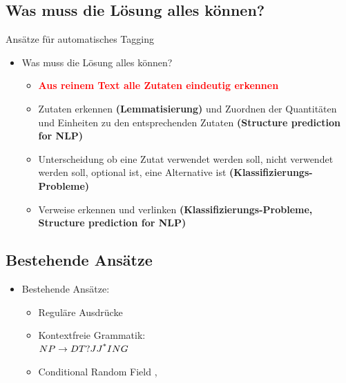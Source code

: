 \documentclass[12pt]{beamer}
\begin{document}
\subsection{Was muss die Lösung alles können?}
\begin{frame}{Ansätze für automatisches Tagging}
	\begin{itemize}
		\item Was muss die Lösung alles können?
		\begin{itemize}
			\item \textbf{\textcolor{red}{Aus reinem Text alle Zutaten eindeutig erkennen}}
			\item Zutaten erkennen \textbf{(Lemmatisierung)} und Zuordnen der Quantitäten und Einheiten zu den entsprechenden Zutaten \textbf{(Structure prediction for NLP)}
			\item Unterscheidung ob eine Zutat verwendet werden soll, nicht verwendet werden soll, optional ist, eine Alternative ist \textbf{(Klassifizierungs-Probleme)}
			\item Verweise erkennen und verlinken \textbf{(Klassifizierungs-Probleme, Structure prediction for NLP)}
		\end{itemize}
	\end{itemize}
\end{frame}

\subsection{Bestehende Ansätze}
\begin{frame}
	\begin{itemize}
		\item Bestehende Ansätze:
		\begin{itemize}
			\item Reguläre Ausdrücke \parencite{REgutGenug}
			\item Kontextfreie Grammatik: \parencite{GrammaBased} \\
			$NP \rightarrow DT? JJ\textsuperscript{*} ING$
			\item Conditional Random Field \parencite{CRFPaper}, \parencite{CRFZeit}
		\end{itemize}
	\end{itemize}
\end{frame}
\end{document}
